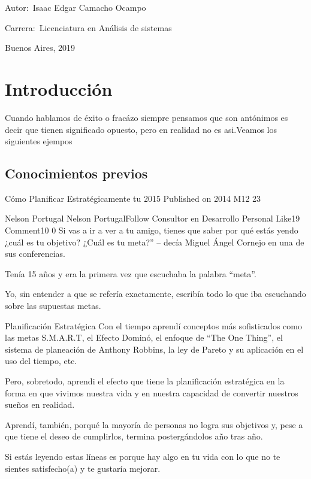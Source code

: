 \documentclass[12pt]{book}
\begin{document}
\noindent Autor:\,	Isaac Edgar Camacho Ocampo
 
\noindent Carrera:\,	Licenciatura en An\'alisis de sistemas

\vspace{1cm}

\vspace{1cm}

\noindent Buenos Aires, 2019

\newpage


\tableofcontents

\tableofcontents
\chapter{Introducción}
Cuando hablamos de \'exito o frac\'azo siempre pensamos que son antónimos es decir que tienen significado opuesto, pero en realidad no es asi.Veamos los siguientes ejempos
\section{Conocimientos previos}

Cómo Planificar Estratégicamente tu 2015
Published on 2014 M12 23

Nelson Portugal
Nelson PortugalFollow
Consultor en Desarrollo Personal
Like19
Comment10
0
Si vas a ir a ver a tu amigo, tienes que saber por qué estás yendo ¿cuál es tu objetivo? ¿Cuál es tu meta?” – decía Miguel Ángel Cornejo en una de sus conferencias.

Tenía 15 años y era la primera vez que escuchaba la palabra “meta”.

Yo, sin entender a que se refería exactamente, escribía todo lo que iba escuchando sobre las supuestas metas.

Planificación Estratégica
Con el tiempo aprendí conceptos más sofisticados como las metas S.M.A.R.T, el Efecto Dominó, el enfoque de “The One Thing”, el sistema de planeación de Anthony Robbins, la ley de Pareto y su aplicación en el uso del tiempo, etc.

Pero, sobretodo, aprendi el efecto que tiene la planificación estratégica en la forma en que vivimos nuestra vida y en nuestra capacidad de convertir nuestros sueños en realidad.

Aprendí, también, porqué la mayoría de personas no logra sus objetivos y, pese a que tiene el deseo de cumplirlos, termina postergándolos año tras año.

Si estás leyendo estas líneas es porque hay algo en tu vida con lo que no te sientes satisfecho(a) y te gustaría mejorar.
\end{document}
